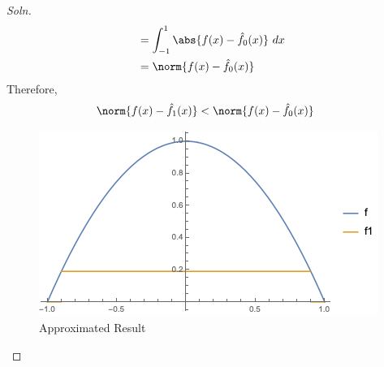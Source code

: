 \documentclass{article}
\begin{document}
\begin{proof}[Soln]
\begin{align}
			&= \int_{-1}^1 \abs{f(x) - \hat{f}_0(x)}\ dx \\
			&= \norm{f(x) - \hat{f}_0(x)}
		\end{align}
		Therefore, 
		\begin{align}
			\norm{f(x) - \hat{f}_1(x)} &< \norm{f(x) - \hat{f}_0(x)}
		\end{align}
		\begin{figure}[H]
			\center
			\includegraphics[width=0.7\linewidth]{plot_132.png}
			\caption{Approximated Result}
		\end{figure}
	\end{proof}
\end{document}
